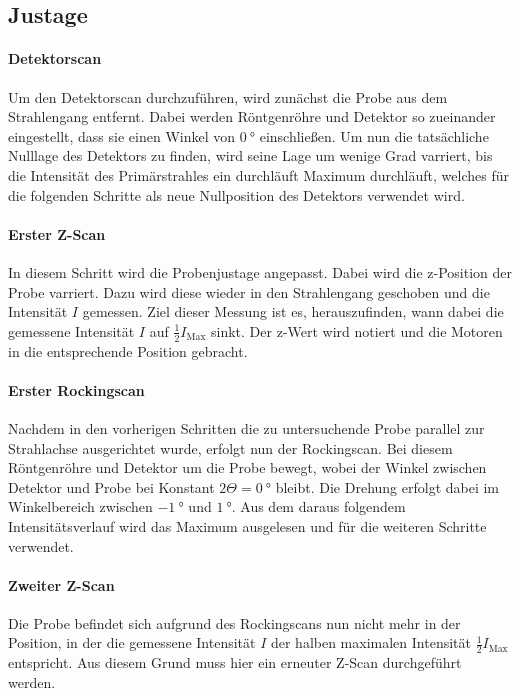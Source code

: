 \subsection{Justage}
\paragraph{Detektorscan}
Um den Detektorscan durchzuführen, wird zunächst die Probe aus dem Strahlengang entfernt. 
Dabei werden Röntgenröhre und Detektor so zueinander eingestellt,
dass sie einen Winkel von $\SI{0}{\degree}$ einschließen. Um nun die tatsächliche Nulllage des Detektors zu finden, wird seine Lage um wenige Grad varriert, bis die Intensität des Primärstrahles ein durchläuft Maximum durchläuft, welches für die folgenden Schritte als neue Nullposition des Detektors verwendet wird. 

\paragraph{Erster Z-Scan}
In diesem Schritt wird die Probenjustage angepasst. Dabei wird die z-Position der Probe varriert. Dazu wird diese wieder in den Strahlengang geschoben und die Intensität $I$ gemessen. Ziel dieser Messung ist es, herauszufinden, wann dabei die gemessene Intensität $I$ auf $\frac{1}{2} I_\text{Max} $ sinkt. Der z-Wert wird notiert und die Motoren in die entsprechende Position gebracht. 

\paragraph{Erster Rockingscan}
Nachdem in den vorherigen Schritten die zu untersuchende Probe parallel zur Strahlachse ausgerichtet wurde, erfolgt nun der Rockingscan. Bei diesem Röntgenröhre und Detektor um die Probe bewegt, wobei der Winkel zwischen Detektor und Probe bei Konstant $2\Theta = \SI{0}{\degree}$ bleibt. Die Drehung erfolgt dabei im Winkelbereich zwischen $\SI{-1}{\degree}$ und $\SI{1}{\degree}$. Aus dem daraus folgendem Intensitätsverlauf wird das Maximum ausgelesen und für die weiteren Schritte verwendet. 

\paragraph{Zweiter Z-Scan}
Die Probe befindet sich aufgrund des Rockingscans nun nicht mehr in der Position, in der die gemessene Intensität $I$ der halben maximalen Intensität $\frac{1}{2} I_\text{Max} $ entspricht. Aus diesem Grund muss hier ein erneuter Z-Scan durchgeführt werden. 



